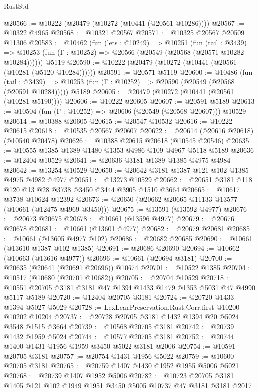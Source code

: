 \begin{lexlean}{RustStd}
\begin{coremodule}
@20566 := @10222 (@20479 (@10272 (@10441 (@20561 @10286))))
@20567 := @10322 @4965
@20568 := @10321 @20567
@20571 := @10325 @20567 @20509 @11306
@20583 := @10462
    (fun (lets : @10249) =>
    @10251
      (fun (tail : @3439) =>
      @10253 (fun (Γ : @10252) => @20566 (@20549 (@20568 (@20571 @10282 @10284))))))
    @5119
@20590 := @10222 (@20479 (@10272 (@10441 (@20561 (@10281 (@5120 @10284))))))
@20591 := @20571 @5119
@20600 := @10486
    (fun (tail : @3439) => @10253 (fun (Γ : @10252) => @20590 (@20549 (@20568 (@20591 @10284)))))
    @5189
@20605 := @20479 (@10272 (@10441 (@20561 (@10281 @5190))))
@20606 := @10222 @20605
@20607 := @20591 @5189
@20613 := @10504 (fun (Γ : @10252) => @20606 (@20549 (@20568 @20607))) @10529
@20614 := @10388 @20605
@20615 := @20547 @10532
@20616 := @10222 @20615
@20618 := @10535 @20567 @20607
@20622 := @20614 (@20616 @20618) (@10540 @20478)
@20626 := @10388 @20615 @20618 (@10545 @20546)
@20635 := @10555 @1385 @1389 @1480 @1353 @4986 @109 @4967 @5118 @5189
@20636 := @12404 @10529
@20641 := @20636 @3181 @1389 @1385 @4975 @4984
@20642 := @13254 @10529
@20650 := @20642 @3181 @1387 @121 @102 @1385 @4975 @4982 @4977
@20651 := @13273 @10529
@20662 := @20651 @3181 @118 @120 @13 @28 @3738 @3450 @3444 @3905 @1510 @3664
@20665 := @10617 @3738 @10624 @12392
@20673 := @20650 (@20662 @20665 @11133 @13577 (@10661 (@12475 @4969 @3450)))
@20675 := @13591 (@13592 @4977)
@20676 := @20673 @20675
@20678 := @10661 (@13596 @4977)
@20679 := @20676 @20678
@20681 := @10661 (@13601 @4977)
@20682 := @20679 @20681
@20685 := @10661 (@13605 @4977 @102)
@20686 := @20682 @20685
@20690 := @10661 (@13610 @1387 @102 @1385)
@20691 := @20686 @20690
@20694 := @10662 (@10663 (@13616 @4977))
@20696 := @10661 (@20694 @3181)
@20700 := @20635 (@20641 (@20691 @20696)) @10674
@20701 := @10522 @1385
@20704 := @10517 (@10680 (@20701 @10682))
@20705 := @20704 @10529
@20718 := @10551 @20705 @3181 @3181 @47 @1394 @1433 @1479 @1353 @5031 @47 @4990 @5117 @5189
@20720 := @12404 @20705 @3181
@20724 := @20720 @1433 @1394 @5027 @5029
@20728 := LexLeanPreservation.Rust.Corr.first @10200 @10202 @10204
@20737 := @20728 @20705 @3181 @1432 @1394 @20 @5024 @3548 @1515 @3664
@20739 := @10568 @20705 @3181
@20742 := @20739 @1432 @1959 @5024
@20744 := @10577 @20705 @3181
@20752 := @20744 @1400 @1431 @1956 @1959 @3450 @5022 @3181 @2006
@20754 := @10591 @20705 @3181
@20757 := @20754 @1431 @1956 @5022
@20759 := @10600 @20705 @3181
@20765 := @20759 @1407 @1430 @1952 @1955 @5006 @5021
@20768 := @20739 @1407 @1952 @5006
@20782 := @10723 @20705 @3181 @1405 @121 @102 @1949 @1951 @3450 @5005 @10737 @47 @3181 @3181 @2017

\end{coremodule}
\end{lexlean}
